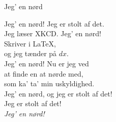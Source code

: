 \begin{song}{Jeg' en nørd}
  \begin{SBChorus}
    Jeg' en nørd! Jeg er stolt af det.\\
    Jeg læser XKCD. Jeg' en nørd!\\
    Skriver i \LaTeX,\\
    og jeg tænder på $dx$.\\\medskip
    Jeg' en nørd! Nu er jeg ved\\
    at finde en at nørde med,\\
    som ka’ ta’ min uskyldighed.\\
    Jeg' en nørd, og jeg er stolt af det!\\\medskip
    Jeg er stolt af det!\\\medskip
    \emph{Jeg' en nørd!}
  \end{SBChorus}
\end{song}
